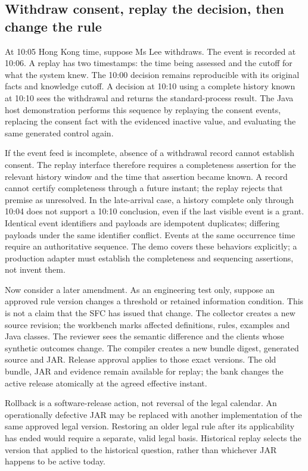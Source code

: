 \documentclass[12pt,a4paper,oneside,openany]{book}
\begin{document}
\subsection{Withdraw consent, replay the decision, then change the rule}
\label{merge:P-01b-complete-dry-run:06}


At 10:05 Hong Kong time, suppose Ms Lee withdraws. The event is recorded at
10:06. A replay has two timestamps: the time being assessed and the cutoff for
what the system knew. The 10:00 decision remains reproducible with its original
facts and knowledge cutoff. A decision at 10:10 using a complete history known
at 10:10 sees the withdrawal and returns the standard-process result.
The Java host demonstration performs this sequence by replaying the consent
events, replacing the consent fact with the evidenced inactive value, and
evaluating the same generated control again.

If the event feed is incomplete, absence of a withdrawal record cannot establish
consent. The replay interface therefore requires a completeness assertion for
the relevant history window and the time that assertion became known. A record cannot certify completeness
through a future instant; the replay rejects that premise as unresolved. In the
late-arrival case, a history complete only through 10:04 does not support a
10:10 conclusion, even if the last visible event is a grant. Identical event
identifiers and payloads are idempotent duplicates; differing payloads under
the same identifier conflict. Events at the same occurrence time require an
authoritative sequence. The demo covers these behaviors explicitly; a production
adapter must establish the completeness and sequencing assertions, not invent
them.

Now consider a later amendment. As an engineering test only, suppose an approved
rule version changes a threshold or retained information condition. This is not
a claim that the SFC has issued that change. The collector creates a new source
revision; the workbench marks affected definitions, rules, examples and Java
classes. The reviewer sees the semantic difference and the clients whose
synthetic outcomes change. The compiler creates a new bundle digest, generated
source and JAR. Release approval applies to those exact versions. The old
bundle, JAR and evidence remain available for replay; the bank changes the
active release atomically at the agreed effective instant.

Rollback is a software-release action, not reversal of the legal calendar.
An operationally defective JAR may be replaced with another implementation of
the same approved legal version. Restoring an older legal rule after its
applicability has ended would require a separate, valid legal basis. Historical
replay selects the version that applied to the historical question, rather
than whichever JAR happens to be active today.
\end{document}
